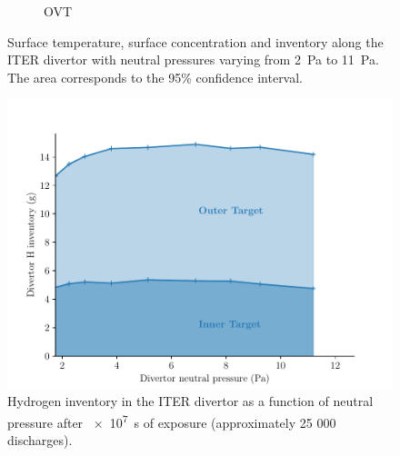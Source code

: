 \begin{figure}[h!]
\begin{subfigure}{0.58\linewidth}
        \caption{OVT}
    \end{subfigure}
    \caption{Surface temperature, surface concentration and inventory along the ITER divertor with neutral pressures varying from \SI{2}{Pa} to \SI{11}{Pa}. The area corresponds to the 95\% confidence interval.}
\end{figure}


\begin{figure}[h]
    \centering
    \includegraphics[width=\linewidth]{Figures/Chapter4/ITER/inventory_vs_divertor_pressure.pdf}
    \caption{Hydrogen inventory in the ITER divertor as a function of neutral pressure after \SI{e7}{s} of exposure (approximately 25 000 discharges).}
\end{figure}


